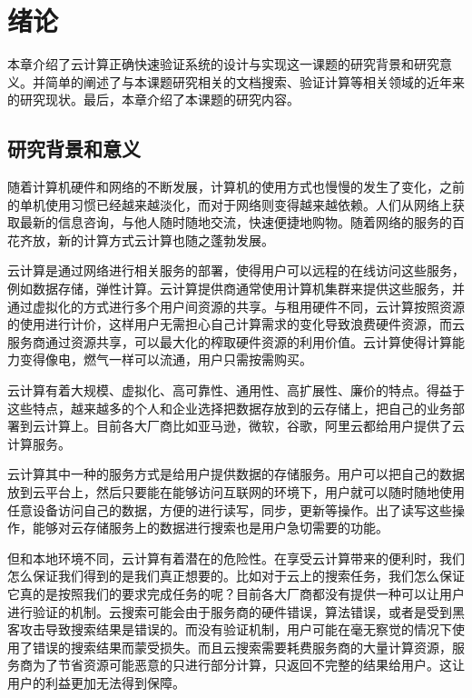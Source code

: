 \chapter{绪论}
\label{chap:introduction}

本章介绍了云计算正确快速验证系统的设计与实现这一课题的研究背景和研究意义。并简单的阐述了与本课题研究相关的文档搜索、验证计算等相关领域的近年来的研究现状。最后，本章介绍了本课题的研究内容。

\section{研究背景和意义}
随着计算机硬件和网络的不断发展，计算机的使用方式也慢慢的发生了变化，之前的单机使用习惯已经越来越淡化，而对于网络则变得越来越依赖。人们从网络上获取最新的信息咨询，与他人随时随地交流，快速便捷地购物。随着网络的服务的百花齐放，新的计算方式云计算也随之蓬勃发展。

云计算\cite{CloudComputing}是通过网络进行相关服务的部署，使得用户可以远程的在线访问这些服务，例如数据存储，弹性计算。云计算提供商通常使用计算机集群来提供这些服务，并通过虚拟化的方式进行多个用户间资源的共享。与租用硬件不同，云计算按照资源的使用进行计价，这样用户无需担心自己计算需求的变化导致浪费硬件资源，而云服务商通过资源共享，可以最大化的榨取硬件资源的利用价值。云计算使得计算能力变得像电，燃气一样可以流通，用户只需按需购买。

云计算有着大规模、虚拟化、高可靠性、通用性、高扩展性、廉价的特点。得益于这些特点，越来越多的个人和企业选择把数据存放到的云存储上，把自己的业务部署到云计算上。目前各大厂商比如亚马逊，微软，谷歌，阿里云都给用户提供了云计算服务。

云计算其中一种的服务方式是给用户提供数据的存储服务。用户可以把自己的数据放到云平台上，然后只要能在能够访问互联网的环境下，用户就可以随时随地使用任意设备访问自己的数据，方便的进行读写，同步，更新等操作。出了读写这些操作，能够对云存储服务上的数据进行搜索也是用户急切需要的功能。

但和本地环境不同，云计算有着潜在的危险性\cite{CloudComputing}。在享受云计算带来的便利时，我们怎么保证我们得到的是我们真正想要的。比如对于云上的搜索任务，我们怎么保证它真的是按照我们的要求完成任务的呢？目前各大厂商都没有提供一种可以让用户进行验证的机制。云搜索可能会由于服务商的硬件错误，算法错误，或者是受到黑客攻击导致搜索结果是错误的。而没有验证机制，用户可能在毫无察觉的情况下使用了错误的搜索结果而蒙受损失。而且云搜索需要耗费服务商的大量计算资源，服务商为了节省资源可能恶意的只进行部分计算，只返回不完整的结果给用户。这让用户的利益更加无法得到保障。

